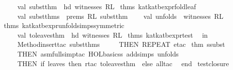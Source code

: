 \begin{isabellebody}
\ \ \ \ val\ subst{}thm\ {}\ hd\ {}witnesses\ RL\ %
\isaantiq
thms\ kat{}kat{}bexpr{}fold{}leaf{}%
\endisaantiq
{}\isanewline
\ \ \ \ val\ subst{}thms\ {}\ prems\ RL\ {}subst{}thm{}\isanewline
\ \ \ \ val\ unfolds\ {}\ witnesses\ RL\ %
\isaantiq
thms\ kat{}kat{}bexpr{}unfold{}simps{}symmetric{}{}%
\endisaantiq
\isanewline
\ \ \ \ val\ to{}leaves{}thm\ {}\ hd\ {}witnesses\ RL\ %
\isaantiq
thms\ kat{}kat{}bexpr{}test{}%
\endisaantiq
{}\isanewline
\ \ in\isanewline
\ \ \ \ Method{}insert{}tac\ subst{}thms\ {}\isanewline
\ \ \ \ THEN\ REPEAT\ {}etac\ %
\isaantiq
thm\ ssubst{}%
\endisaantiq
\ {}{}\isanewline
\ \ \ \ THEN\ asm{}full{}simp{}tac\ {}HOL{}basic{}ss\ addsimps\ unfolds{}\ {}\isanewline
\ \ \ \ THEN\ {}if\ leaves\ then\ rtac\ to{}leaves{}thm\ {}\ else\ all{}tac{}\isanewline
\ \ end{}\isanewline
\isanewline
{}\isanewline
\isanewline
{}\isamarkupfalse%
\ test{}closure\ {}\ {}\isanewline

\end{isabellebody}
